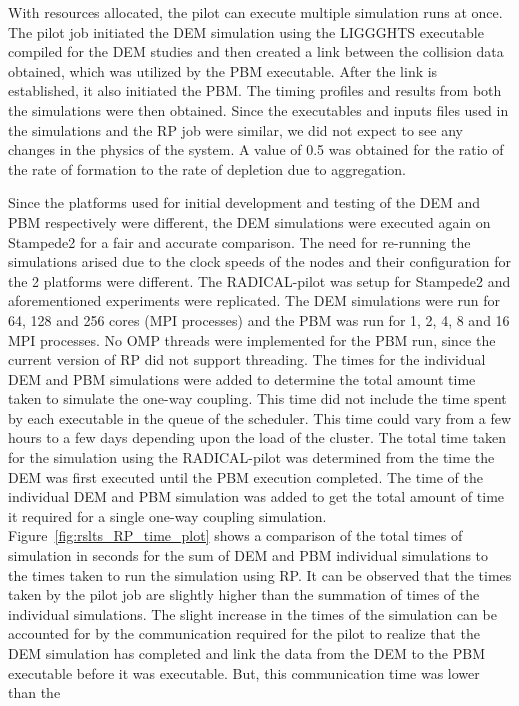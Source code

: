 \documentclass[preprint,11pt,authoryear]{elsarticle}
\begin{document}
With resources allocated, the pilot can execute multiple simulation runs at once. The pilot job
initiated the DEM simulation using the LIGGGHTS executable compiled for the
DEM studies and then created a link between the collision data obtained, which
was utilized by the PBM executable. After the link is
established, it also initiated the PBM. The timing profiles and results from
both the simulations were then obtained. Since the executables and inputs files
used in the simulations and the RP job were similar, we did not expect to
see any changes in the physics of the system. A value of 0.5 was obtained for
the ratio of the rate of formation to the rate of depletion due to aggregation.

Since the platforms used for initial development and testing of the DEM and
PBM respectively were different, the DEM simulations were executed again on
Stampede2 for a fair and accurate comparison. The need for re-running the
simulations arised due to the clock speeds of the nodes and their
configuration for the 2 platforms were different. The RADICAL-pilot was setup
for Stampede2 and aforementioned experiments were replicated. The DEM
simulations were run for 64, 128 and 256 cores (MPI processes) and the PBM was
run for 1, 2, 4, 8 and 16 MPI processes. No OMP threads were implemented for
the PBM run, since the current version of RP did not support threading. The
times for the individual DEM and PBM simulations were added to determine the
total amount time taken to simulate the one-way coupling. This time did not
include the time spent by each executable in the queue of the scheduler. This
time could vary from a few hours to a few days depending upon the load of the
cluster. The total time taken for the simulation using the RADICAL-pilot was
determined from the time the DEM was first executed until the PBM execution
completed. The time of the individual DEM and PBM simulation was added to get
the total amount of time it required for a single one-way coupling simulation.
Figure~\ref{fig:rslts_RP_time_plot} shows a comparison of the total times of
simulation in seconds for the sum of DEM and PBM individual simulations to the
times taken to run the simulation using RP. It can be observed that the times
taken by the pilot job are slightly higher than the summation of times of the
individual simulations. The slight increase in the times of the simulation can
be accounted for by the communication required for the pilot to realize that the
DEM simulation has completed and link the data from the DEM to the PBM
executable before it was executable. But, this communication time was lower than the
\end{document}
